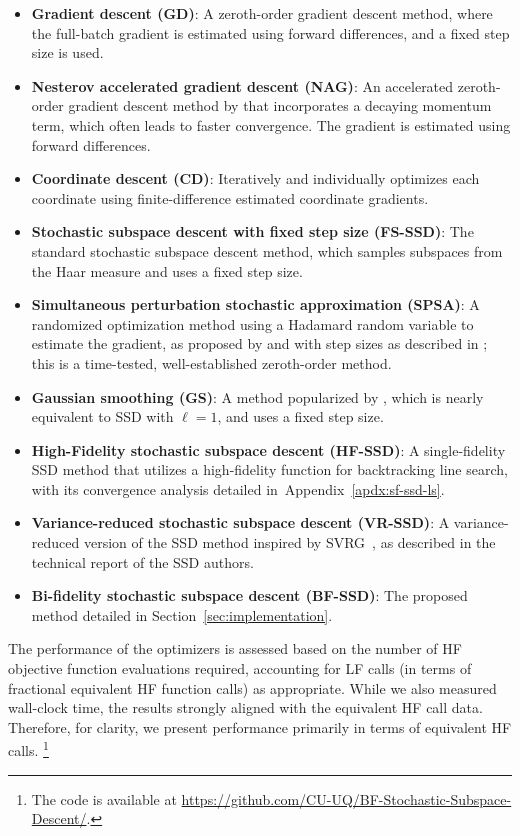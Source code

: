 \documentclass[10pt]{article} %
\numberwithin{equation}{section}
\theoremstyle{plain}
\theoremstyle{definition}
\newcommand{\<}{\langle}
\renewcommand{\>}{\rangle}
\renewcommand{\(}{\left(}
\renewcommand{\)}{\right)}
\renewcommand{\[}{\left[}
\renewcommand{\]}{\right]}
\begin{document}
\begin{itemize}
    \item \textbf{Gradient descent (GD)}: A zeroth-order gradient descent method, where the full-batch gradient is estimated using forward differences, and a fixed step size is used.
    \item \textbf{Nesterov accelerated gradient descent (NAG)}: An accelerated zeroth-order gradient descent method by \citet{nesterov269method} that incorporates a decaying momentum term, which often leads to faster convergence. The gradient is estimated using forward differences.
    \item \textbf{Coordinate descent (CD)}: Iteratively and individually optimizes each coordinate using finite-difference estimated coordinate gradients.
    \item \textbf{Stochastic subspace descent with fixed step size (FS-SSD)}: The standard stochastic subspace descent method, which samples subspaces from the Haar measure and uses a fixed step size.
    \item \textbf{Simultaneous perturbation stochastic approximation (SPSA)}: A randomized optimization method using a Hadamard random variable to estimate the gradient, as proposed by \citet{spall1992multivariate} and with step sizes as described in \citet{spall1998implementation}; this is a time-tested, well-established zeroth-order method.
    \item \textbf{Gaussian smoothing (GS)}: A method popularized by \citet{nesterov2017random}, which is nearly equivalent to SSD with $\ell=1$, and uses a fixed step size.
    \item \textbf{High-Fidelity stochastic subspace descent (HF-SSD)}: A single-fidelity SSD method that utilizes a high-fidelity function for backtracking line search, with its convergence analysis detailed in~Appendix~\ref{apdx:sf-ssd-ls}.
    \item \textbf{Variance-reduced stochastic subspace descent (VR-SSD)}: A variance-reduced version of the SSD method inspired by SVRG~\citep{SVRG2013}, as described in the technical report \citet[Section 2.2]{kozak2019stochastic} of the SSD authors.
    \item \textbf{Bi-fidelity stochastic subspace descent (BF-SSD)}: The proposed method detailed in Section~\ref{sec:implementation}.
\end{itemize}

The performance of the optimizers is assessed based on the number of HF objective function evaluations required, accounting for LF calls (in terms of fractional equivalent HF function calls) as appropriate. While we also measured wall-clock time, the results strongly aligned with the equivalent HF call data. Therefore, for clarity, we present performance primarily in terms of equivalent HF calls.
\footnote{The code is available at  \href{https://github.com/CU-UQ/BF-Stochastic-Subspace-Descent/}{https://github.com/CU-UQ/BF-Stochastic-Subspace-Descent/}.}
\end{document}

